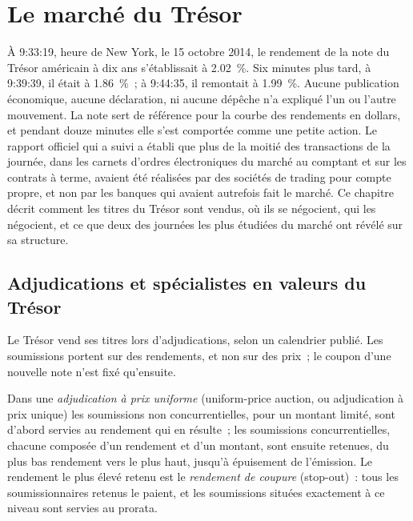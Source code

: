 \chapter{Le marché du Trésor}\label{ch:m2:the-treasury-market}

À 9:33:19, heure de New York, le 15 octobre 2014, le rendement de la note du
Trésor américain à dix ans s'établissait à 2.02~\%. Six minutes plus tard, à 9:39:39, il était à 1.86~\%~;
à 9:44:35, il remontait à 1.99~\%. Aucune publication économique, aucune déclaration,
ni aucune dépêche n'a expliqué l'un ou l'autre mouvement. La note sert de référence pour la
courbe des rendements en dollars, et pendant douze minutes elle s'est comportée comme une petite action. Le rapport officiel qui a suivi a établi que plus
de la moitié des transactions de la journée, dans les carnets d'ordres électroniques du marché au comptant
et sur les contrats à terme, avaient été réalisées par des sociétés de trading pour compte propre, et non
par les banques qui avaient autrefois fait le marché. Ce chapitre décrit comment
les titres du Trésor sont vendus, où ils se négocient, qui les négocient, et ce que deux des
journées les plus étudiées du marché ont révélé sur sa structure.

\section{Adjudications et spécialistes en valeurs du Trésor}

Le Trésor vend ses titres lors d'adjudications, selon un calendrier publié. Les
soumissions portent sur des rendements, et non sur des prix~; le coupon d'une nouvelle note n'est fixé qu'ensuite.

\begin{definition}\label{def:m2:the-treasury-market:auction}
Dans une \emph{adjudication à prix uniforme} (uniform-price auction, ou adjudication à prix unique)
les soumissions non concurrentielles, pour un montant limité, sont d'abord servies
au rendement qui en résulte~; les soumissions concurrentielles, chacune
composée d'un rendement et d'un montant, sont ensuite retenues, du plus bas rendement vers le plus haut, jusqu'à épuisement de
l'émission. Le rendement le plus élevé retenu est le \emph{rendement de coupure} (stop-out)~:
tous les soumissionnaires retenus le paient, et les soumissions situées exactement à ce niveau sont servies au
prorata.
\end{definition}

